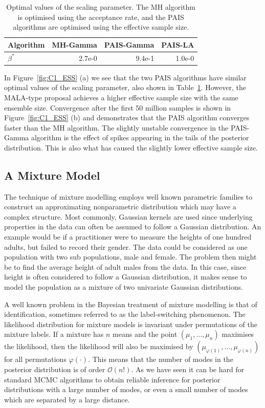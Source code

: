 \documentclass[final]{siamltex}
\begin{document}
\begin{table}[!htb]
      \centering
        \begin{tabular}{|l|r|r|r|}
	\hline
	Algorithm	& MH-Gamma & PAIS-Gamma & PAIS-LA \\ \hline
	$\beta^*$	& 2.7e-0     & 9.4e-1    & 1.0e-0 \\
	\hline
	\end{tabular}
	\vspace{1mm}
	\caption{Optimal values of the scaling parameter. The MH algorithm is optimised using the acceptance rate, and the PAIS algorithms are optimised using the effective sample size.}
	\label{table:C1_opt_beta}
\end{table}

In Figure~\ref{fig:C1_ESS} (a) we see that the two PAIS algorithms have similar optimal values of the scaling parameter, also shown in Table~\ref{table:C1_opt_beta}. However, the MALA-type proposal achieves a higher effective sample size with the same ensemble size. Convergence after the first 50 million samples is shown in Figure~\ref{fig:C1_ESS} (b) and demonstrates that the PAIS algorithm converges faster than the MH algorithm. The slightly unstable convergence in the PAIS-Gamma algorithm is the effect of spikes appearing in the tails of the posterior distribution. This is also what has caused the slightly lower effective sample size.

\subsection{A Mixture Model}\label{sec:mixture}

The technique of mixture modelling employs well known parametric families to construct an approximating nonparametric distribution which may have a complex structure. Most commonly, Gaussian kernels are used since underlying properties in the data can often be assumed to follow a Gaussian distribution. An example would be if a practitioner were to measure the heights of one hundred adults, but failed to record their gender. The data could be considered as one population with two sub populations, male and female. The problem then might be to find the average height of adult males from the data. In this case, since height is often considered to follow a Gaussian distribution, it makes sense to model the population as a mixture of two univariate Gaussian distributions.

A well known problem in the Bayesian treatment of mixture modelling is that of identification, sometimes referred to as the label-switching phenomenon. The likelihood distribution for mixture models is invariant under permutations of the mixture labels. If a mixture has $n$ means and the point $(\mu_1, \dots, \mu_n)$ maximises the likelihood, then the likelihood will also be maximised by $(\mu_{\varphi(1)}, \dots, \mu_{\varphi(n)})$ for all permutations $\varphi(\cdot)$. This means that the number of modes in the posterior distribution is of order $\mathcal{O}(n!)$. As we have seen it can be hard for standard MCMC algorithms to obtain reliable inference for posterior distributions with a large number of modes, or even a small number of modes which are separated by a large distance.
\end{document}

